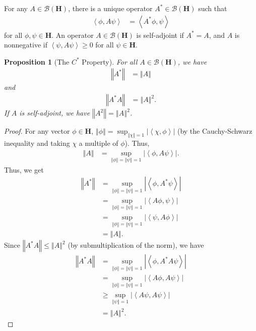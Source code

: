 \documentclass[10pt]{extarticle}
\newcommand{\iprod}[2]{\left\langle #1,#2\right\rangle}
\newcommand{\norm}[1]{\left\Vert #1\right\Vert}
\theoremstyle{plain}
\newtheorem*{proposition}{Proposition}%
\theoremstyle{definition}
\theoremstyle{remark}
\begin{document}
  For any $A\in \mathcal{B}(\mathbf{H})$, there is a unique operator $A^{\ast}\in \mathcal{B}(\mathbf{H})$ such that
  \begin{align*}
    \iprod{\phi}{A\psi} &= \iprod{A^{\ast}\phi}{\psi}
  \end{align*}
  for all $\phi,\psi \in \mathbf{H}$. An operator $A\in \mathcal{B}(\mathbf{H})$ is self-adjoint if $A^{\ast} = A$, and $A$ is nonnegative if $\iprod{\psi}{A\psi} \geq 0$ for all $\psi \in \mathbf{H}$.
  \begin{proposition}[The $C^{\ast}$ Property]
    For all $A\in \mathcal{B}(\mathbf{H})$, we have
    \begin{align*}
      \norm{A^{\ast}} &= \norm{A}
    \end{align*}
    and
    \begin{align*}
      \norm{A^{\ast}A} &= \norm{A}^2.
    \end{align*}
    If $A$ is self-adjoint, we have $\norm{A^2} = \norm{A}^2$.
  \end{proposition}
  \begin{proof}
    For any vector $\phi \in \mathbf{H}$, $\norm{\phi} = \sup_{\norm{\chi} = 1}|\iprod{\chi}{\phi}|$ (by the Cauchy-Schwarz inequality and taking $\chi$ a multiple of $\phi$). Thus,
    \begin{align*}
      \norm{A} &= \sup_{\norm{\phi} = \norm{\psi} = 1} |\iprod{\phi}{A\psi}|.
    \end{align*}
    Thus, we get
    \begin{align*}
      \norm{A^{\ast}} &= \sup_{\norm{\phi} = \norm{\psi} = 1} |\iprod{\phi}{A^{\ast}\psi}|\\
                      &= \sup_{\norm{\phi} = \norm{\psi} = 1} |\iprod{A\phi}{\psi}|\\
                      &=\sup_{\norm{\phi} = \norm{\psi} = 1} |\iprod{\psi}{A\phi}|\\
                      &= \norm{A}.
    \end{align*}
    Since $\norm{A^{\ast}A} \leq \norm{A}^2$ (by submultiplication of the norm), we have
    \begin{align*}
      \norm{A^{\ast}A} &= \sup_{\norm{\phi} = \norm{\psi} = 1}|\iprod{\phi}{A^{\ast}A\psi}|\\
                       &= \sup_{\norm{\phi} = \norm{\psi} = 1} |\iprod{A\phi}{A\psi}|\\
                       &\geq \sup_{\norm{\psi} = 1}|\iprod{A\psi}{A\psi}|\\
                       &= \norm{A}^2.
    \end{align*}
  \end{proof}
\end{document}

